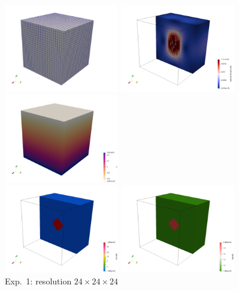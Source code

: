\begin{center}
\includegraphics[width=5cm]{python_codes/fieldstone_10/results/exp1/grid}
\includegraphics[width=5cm]{python_codes/fieldstone_10/results/exp1/vel}
\includegraphics[width=5cm]{python_codes/fieldstone_10/results/exp1/press}\\
\includegraphics[width=5cm]{python_codes/fieldstone_10/results/exp1/visc}
\includegraphics[width=5cm]{python_codes/fieldstone_10/results/exp1/dens}\\
{\small Exp.~1: resolution $24\times 24\times 24$}
\end{center}

